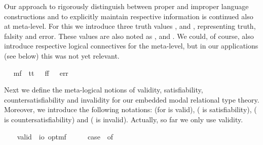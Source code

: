 \begin{isabellebody}
\isamarkuptrue%
%
\begin{isamarkuptext}%
Our approach to rigorously distinguish between proper and improper language constructions 
  and to explicitly maintain respective information is continued also at meta-level. For this 
  we introduce three truth values ,
   and , representing truth, falsity and error. These values are also 
  noted as \isa{{\isasymtop}}, \isa{{\isasymbottom}} and \isa{{\isacharasterisk}}. We could, of course, also introduce  
  respective logical connectives for the meta-level, but in our applications (see below)
  this was not yet relevant.%
\end{isamarkuptext}%
\isamarkuptrue%
\ \isamarkupfalse%
\ mf\ {\isacharequal}\ tt\ {\isacharparenleft}{\isachardoublequoteopen}{\isasymtop}{\isachardoublequoteclose}{\isacharparenright}\ {\isacharbar}\ ff\ {\isacharparenleft}{\isachardoublequoteopen}{\isasymbottom}{\isachardoublequoteclose}{\isacharparenright}\ {\isacharbar}\ err\ {\isacharparenleft}{\isachardoublequoteopen}{\isacharasterisk}{\isachardoublequoteclose}{\isacharparenright}%
\begin{isamarkuptext}%
Next we define the meta-logical notions of validity, satisfiability, 
  countersatisfiability and invalidity for our embedded modal relational type theory. Moreover, 
  we introduce the following notations: \isa{{\isacharbrackleft}{\isasymphi}{\isacharbrackright}} 
  (for \isa{{\isasymphi}} is valid),  (\isa{{\isasymphi}} is satisfiability),  
  (\isa{{\isasymphi}} is countersatisfiability) and  (\isa{{\isasymphi}} is invalid). Actually, so far 
  we only use validity.%
\end{isamarkuptext}%
\isamarkuptrue%
\ \ \isamarkupfalse%
\ valid\ {\isacharcolon}{\isacharcolon}\ {\isachardoublequoteopen}io\ opt{\isasymRightarrow}mf{\isachardoublequoteclose}\ {\isacharparenleft}{\isachardoublequoteopen}{\isacharbrackleft}{\isacharunderscore}{\isacharbrackright}{\isachardoublequoteclose}\ {\isacharbrackleft}{}{\isacharbrackright}{\isacharparenright}\ \ {\isachardoublequoteopen}{\isacharbrackleft}{\isasymphi}{\isacharbrackright}\ {\isasymequiv}\ case\ {\isasymphi}\ of\ \isanewline

\end{isabellebody}

